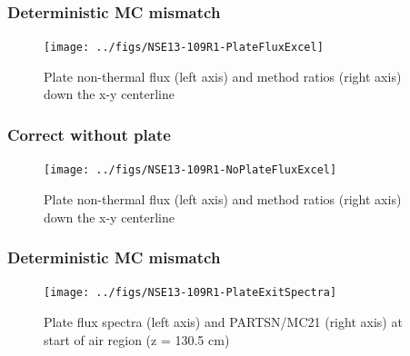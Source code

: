 \documentclass[xcolor=x11names,compress]{beamer}
\renewcommand{\(}{\begin{columns}}
\renewcommand{\)}{\end{columns}}
\newcommand{\<}[1]{\begin{column}{#1}}
\renewcommand{\>}{\end{column}}
\begin{document}
\begin{frame}[fragile]
  \frametitle{Deterministic MC mismatch}
 \begin{figure}[p]
   \begin{center}
     \texttt{[image: ../figs/NSE13-109R1-PlateFluxExcel]}
   \end{center}
   \caption{Plate non-thermal flux (left axis) and method ratios (right axis) down the x-y centerline}
   \label{fig:PlateFlux}
 \end{figure}
\end{frame}


\begin{frame}[fragile]
  \frametitle{Correct without plate}
 \begin{figure}[p]
   \begin{center}
     \texttt{[image: ../figs/NSE13-109R1-NoPlateFluxExcel]}
   \end{center}
   \caption{Plate non-thermal flux (left axis) and method ratios (right axis) down the x-y centerline}
   \label{fig:noPlateFlux}
 \end{figure}
\end{frame}


\begin{frame}[fragile]
  \frametitle{Deterministic MC mismatch}
 \begin{figure}[p]
   \begin{center}
     \texttt{[image: ../figs/NSE13-109R1-PlateExitSpectra]}
   \end{center}
   \caption{Plate flux spectra (left axis) and PARTSN/MC21 (right axis) at start of air region (z = 130.5 cm)}
   \label{fig:PlateExit}
 \end{figure}
\end{frame}
\end{document}
